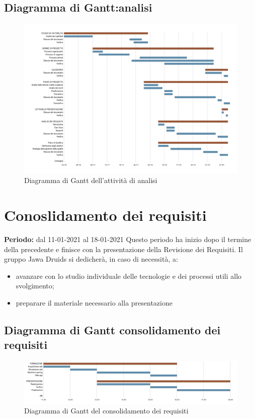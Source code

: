 \subsection{Diagramma di Gantt:analisi}\label{4.1.1}
\begin{figure}[!ht]
	\begin{center}
		\includegraphics[width=1\linewidth]{../immagini/analisi.png}
		\caption{Diagramma di Gantt dell'attività di analisi}
	\end{center}
\end{figure}

\section{Conoslidamento dei requisiti}\label{4.2}
\textbf{Periodo:} dal 11-01-2021 al 18-01-2021
Questo periodo ha inizio dopo il termine della precedente e finisce con la presentazione della Revisione dei Requisiti.
Il gruppo Jawa Druids si dedicherà, in caso di necessità, a:
\begin{itemize}
	\item avanzare con lo studio individuale delle tecnologie e dei processi utili allo svolgimento;
	\item preparare il materiale necessario alla presentazione
\end{itemize}
\subsection{Diagramma di Gantt consolidamento dei requisiti}\label{4.2.1}
\begin{figure}[!ht]
	\begin{center}
		\includegraphics[width=1\linewidth]{../immagini/consolidamento_requisiti.png}
		\caption{Diagramma di Gantt del consolidamento dei requisiti}
	\end{center}
\end{figure}
